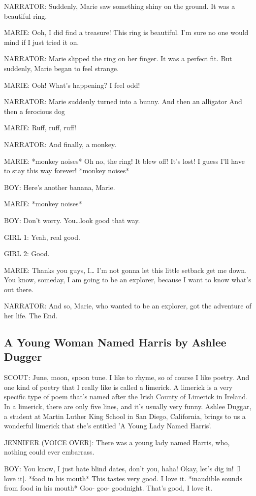 NARRATOR:
Suddenly, Marie saw something shiny on the ground.
It was a beautiful ring.

MARIE:
Ooh, I did find a treasure!
This ring is beautiful.
I'm sure no one would mind if I just tried it on.

NARRATOR:
Marie slipped the ring on her finger.
It was a perfect fit.
But suddenly, Marie began to feel strange.

MARIE:
Ooh!
What's happening?
I feel odd!

NARRATOR:
Marie suddenly turned into a bunny.
And then an alligator
And then a ferocious dog

MARIE:
Ruff, ruff, ruff!

NARRATOR:
And finally, a monkey.

MARIE:
*monkey noises*
Oh no, the ring!
It blew off!
It's lost!
I guess I'll have to stay this way forever!
*monkey noises*

BOY:
Here's another banana, Marie.

MARIE:
*monkey noises*

BOY:
Don't worry.
You\dots look good that way.

GIRL 1:
Yeah, real good.

GIRL 2:
Good.

MARIE:
Thanks you guys, I\dots
I'm not gonna let this little setback get me down.
You know, someday, I am going to be an explorer, because I want to know what's out there.

NARRATOR:
And so, Marie, who wanted to be an explorer, got the adventure of her life.
The End.

\subsection{A Young Woman Named Harris by Ashlee Dugger}

SCOUT:
June, moon, spoon tune.
I like to rhyme, so of course I like poetry.
And one kind of poetry that I really like is called a limerick.
A limerick is a very specific type of poem that's named after the Irish County of Limerick in Ireland.
In a limerick, there are only five lines, and it's usually very funny.
Ashlee Duggar, a student at Martin Luther King School in San Diego, California, brings to us a wonderful limerick that she's entitled 'A Young Lady Named Harris'.

JENNIFER (VOICE OVER):
There was a young lady named Harris, who, nothing could ever embarrass.

BOY:
You know, I just hate blind dates, don't you, haha!
Okay, let's dig in!
[I love it].
*food in his mouth* This tastes very good.
I love it.
*inaudible sounds from food in his mouth*
Goo- goo-  goodnight.
That's good, I love it.

